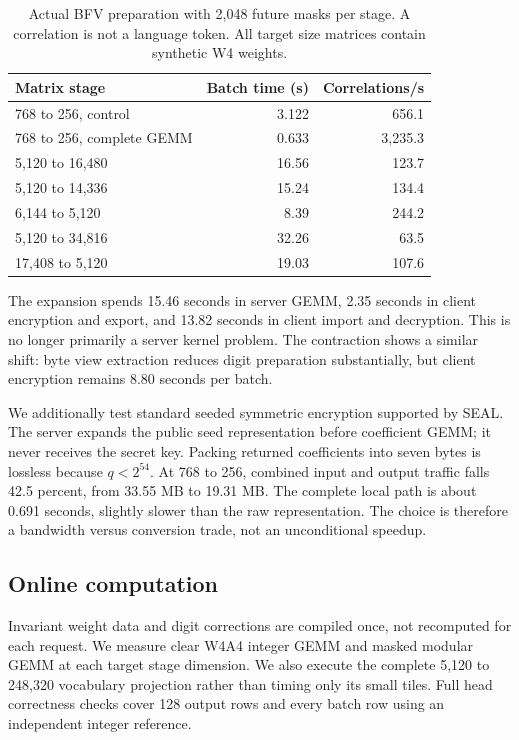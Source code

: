 \documentclass[10pt,twocolumn]{article}
\begin{document}
\begin{table}[t]
\centering\small
\setlength{\tabcolsep}{4.5pt}
\begin{tabular}{lrr}
\toprule
Matrix stage & Batch time (s) & Correlations/s\\
\midrule
768 to 256, control & 3.122 & 656.1\\
768 to 256, complete GEMM & 0.633 & 3,235.3\\
5,120 to 16,480 & 16.56 & 123.7\\
5,120 to 14,336 & 15.24 & 134.4\\
6,144 to 5,120 & 8.39 & 244.2\\
5,120 to 34,816 & 32.26 & 63.5\\
17,408 to 5,120 & 19.03 & 107.6\\
\bottomrule
\end{tabular}
\caption{Actual BFV preparation with 2,048 future masks per stage. A correlation
is not a language token. All target size matrices contain synthetic W4 weights.}
\label{tab:prep}
\end{table}

The expansion spends 15.46 seconds in server GEMM, 2.35 seconds in client
encryption and export, and 13.82 seconds in client import and decryption. This
is no longer primarily a server kernel problem. The contraction shows a similar
shift: byte view extraction reduces digit preparation substantially, but client
encryption remains 8.80 seconds per batch.

We additionally test standard seeded symmetric encryption supported by SEAL.
The server expands the public seed representation before coefficient GEMM; it
never receives the secret key. Packing returned coefficients into seven bytes
is lossless because $q<2^{54}$. At 768 to 256, combined input and output traffic
falls 42.5 percent, from 33.55 MB to 19.31 MB. The complete local path is about
0.691 seconds, slightly slower than the raw representation. The choice is
therefore a bandwidth versus conversion trade, not an unconditional speedup.

\subsection{Online computation}
Invariant weight data and digit corrections are compiled once, not recomputed
for each request. We measure clear W4A4 integer GEMM and masked modular GEMM at
each target stage dimension. We also execute the complete 5,120 to 248,320
vocabulary projection rather than timing only its small tiles. Full head
correctness checks cover 128 output rows and every batch row using an
independent integer reference.
\end{document}
